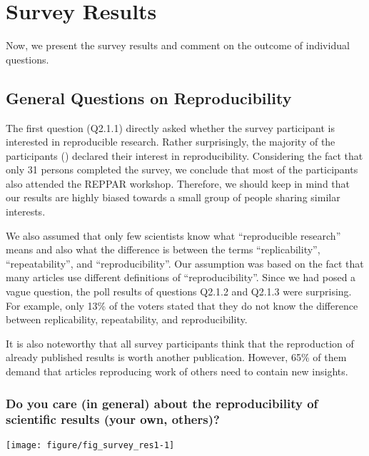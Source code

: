 \documentclass{article}\usepackage[]{graphicx}\usepackage[]{color}
\newenvironment{knitrout}{}{}
\newcommand{\reppar}{REPPAR\xspace}
\newcommand{\ques}[2]{Q2.#1.#2\xspace}
\begin{document}
\newpage
\section{Survey Results}
\label{sec:survey_results}

Now, we present the survey results and comment on the outcome of
individual questions.

\subsection{General Questions on Reproducibility}
\label{sec:general}

The first question (\ques{1}{1}) directly asked whether the survey
participant is interested in reproducible research. Rather
surprisingly, the majority of the participants () declared
their interest in reproducibility. Considering the fact that only 31
persons completed the survey, we conclude that most of the
participants also attended the \reppar workshop. Therefore, we should
keep in mind that our results are highly biased towards a small group
of people sharing similar interests.

We also assumed that only few scientists know what ``reproducible
research'' means and also what the difference is between the terms
``replicability'', ``repeatability'', and ``reproducibility''.  Our
assumption was based on the fact that many articles use different
definitions of ``reproducibility''. Since we had posed a vague
question, the poll results of questions \ques{1}{2} and \ques{1}{3}
were surprising. For example, only 13\% of the voters stated that they
do not know the difference between replicability, repeatability, and
reproducibility.

It is also noteworthy that all survey participants think that the
reproduction of already published results is worth another
publication. However, 65\% of them demand that articles reproducing
work of others need to contain new insights.



\subsubsection{Do you care (in general) about the reproducibility of scientific results (your own, others)?}

\begin{knitrout}
\color{fgcolor}

{\centering \texttt{[image: figure/fig\_survey\_res1-1]} 

}



\end{knitrout}
\end{document}
